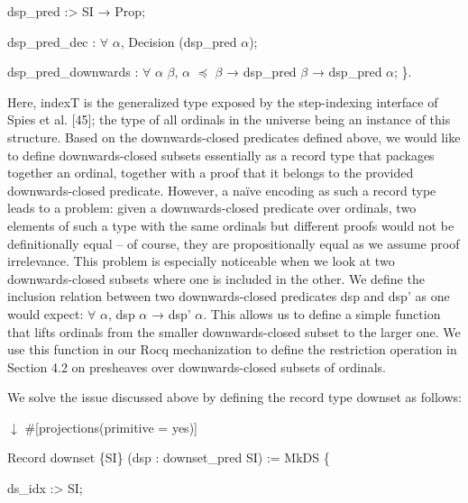 \documentclass[10pt,a4paper]{article}
\begin{document}
  dsp\_pred :> SI → Prop; 
 
  dsp\_pred\_dec : \ensuremath{\forall} \ensuremath{\alpha}, Decision (dsp\_pred \ensuremath{\alpha}); 
 
  dsp\_pred\_downwards : \ensuremath{\forall} \ensuremath{\alpha} \ensuremath{\beta}, \ensuremath{\alpha} \ensuremath{\preceq} \ensuremath{\beta} → dsp\_pred \ensuremath{\beta} → dsp\_pred \ensuremath{\alpha}; \}. 
  
Here, indexT is the generalized type exposed by the step-indexing interface of Spies et al. [45]; the type of all ordinals in the universe being an instance of this structure. Based on the downwards-closed predicates defined above, we would like to define downwards-closed subsets essentially as a record type that packages together an ordinal, together with a proof that it belongs to the provided downwards-closed predicate. However, a naïve encoding as such a record type leads to a problem: given a downwards-closed predicate over ordinals, two elements of such a type with the same ordinals but different proofs would not be definitionally equal – of course, they are propositionally equal as we assume proof irrelevance. This problem is especially noticeable when we look at two downwards-closed subsets where one is included in the other. We define the inclusion relation between two downwards-closed predicates dsp and dsp’ as one would expect: \ensuremath{\forall} \ensuremath{\alpha}, dsp \ensuremath{\alpha} → dsp’ \ensuremath{\alpha}. This allows us to define a simple function that lifts ordinals from the smaller downwards-closed subset to the larger one. We use this function in our Rocq mechanization to define the restriction operation in Section 4.2 on presheaves over downwards-closed subsets of ordinals.\par
 
 
 
We solve the issue discussed above by defining the record type downset as follows:\par
  \ensuremath{\downarrow} 
 \#[projections(primitive = yes)] 
 
 Record downset \{SI\} (dsp : downset\_pred SI) := MkDS \{ 
 
  ds\_idx :> SI; 
 
\end{document}
